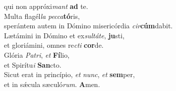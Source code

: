 \evenverse qui non appróxi\textit{mant} \textbf{ad} te.\\
\oddverse Multa flagél\textit{la} \textit{pec}\textit{ca}\textbf{tó}ris,~\*\\
\oddverse sperántem autem in Dómino misericórdia \textit{cir}\textbf{cúm}dabit.\\
\evenverse Lætámini in Dómino et ex\textit{sul}\textit{tá}\textit{te}, \textbf{ju}sti,~\*\\
\evenverse et gloriámini, omnes re\textit{cti} \textbf{cor}de.\\
\oddverse Glória \textit{Pa}\textit{tri}, \textit{et} \textbf{Fí}lio,~\*\\
\oddverse et Spirítu\textit{i} \textbf{San}cto.\\
\evenverse Sicut erat in princípio, \textit{et} \textit{nunc}, \textit{et} \textbf{sem}per,~\*\\
\evenverse et in sǽcula sæculó\textit{rum}. \textbf{A}men.\\
